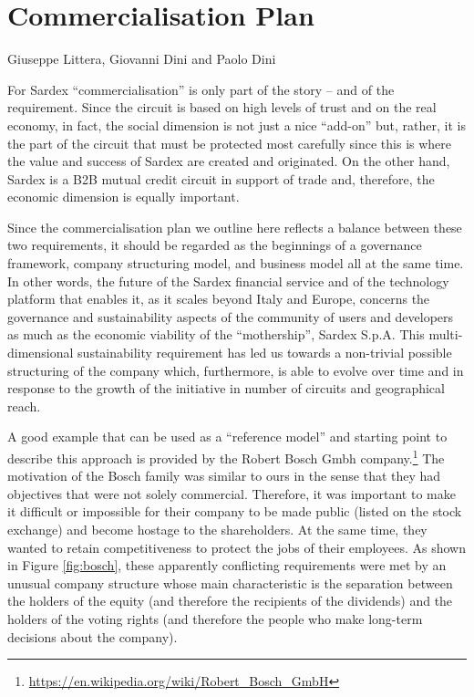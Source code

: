 \chapter{Commercialisation Plan}
\label{ch:commercialisation}

\vspace{-1cm}
\begin{center}
Giuseppe Littera, Giovanni Dini and Paolo Dini
\end{center}

For Sardex ``commercialisation'' is only part of the story -- and of the requirement. Since the circuit is based on high levels of trust and on the real economy, in fact, the social dimension is not just a nice ``add-on'' but, rather, it is the part of the circuit that must be protected most carefully since this is where the value and success of Sardex are created and originated. On the other hand, Sardex is a B2B mutual credit circuit in support of trade and, therefore, the economic dimension is equally important.

Since the commercialisation plan we outline here reflects a balance between these two requirements, it should be regarded as the beginnings of a governance framework, company structuring model, and business model all at the same time. In other words, the future of the Sardex financial service and of the technology platform that enables it, as it scales beyond Italy and Europe, concerns the governance and sustainability aspects of the community of users and developers as much as the economic viability of the ``mothership'', Sardex S.p.A. This multi-dimensional sustainability requirement has led us towards a non-trivial possible structuring of the company which, furthermore, is able to evolve over time and in response to the growth of the initiative in number of circuits and geographical reach.

A good example that can be used as a ``reference model'' and starting point to describe this approach is provided by the Robert Bosch Gmbh company.\footnote{\url{https://en.wikipedia.org/wiki/Robert_Bosch_GmbH}} The motivation of the Bosch family was similar to ours in the sense that they had objectives that were not solely commercial. Therefore, it was important to make it difficult or impossible for their company to be made public (listed on the stock exchange) and become hostage to the shareholders. At the same time, they wanted to retain competitiveness to protect the jobs of their employees. As shown in Figure \ref{fig:bosch}, these apparently conflicting requirements were met by an unusual company structure whose main characteristic is the separation between the holders of the equity (and therefore the recipients of the dividends) and the holders of the voting rights (and therefore the people who make long-term decisions about the company).

